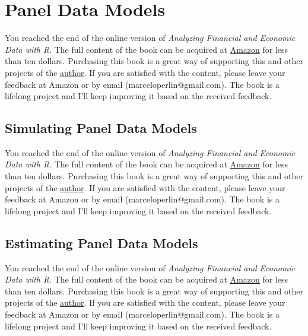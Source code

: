 \documentclass[
  12pt,
]{book}
\newenvironment{pleasebuyit}
{\begin{noteblock}
		
	} {\end{noteblock}}
\begin{document}
\hypertarget{panel-data-models}{%
\section{Panel Data Models}\label{panel-data-models}}

\begin{pleasebuyit}
You reached the end of the online version of \emph{Analyzing Financial
and Economic Data with R}. The full content of the book can be acquired
at \href{https://www.amazon.com/dp/B084LSNXMN}{Amazon} for less than ten
dollars. Purchasing this book is a great way of supporting this and
other projects of the \href{https://www.msperlin.com/}{author}. If you
are satisfied with the content, please leave your feedback at Amazon or
by email (marceloperlin@gmail.com). The book is a lifelong project and
I'll keep improving it based on the received feedback.
\end{pleasebuyit}

\hypertarget{simulating-panel-data-models}{%
\subsection{Simulating Panel Data Models}\label{simulating-panel-data-models}}

\begin{pleasebuyit}
You reached the end of the online version of \emph{Analyzing Financial
and Economic Data with R}. The full content of the book can be acquired
at \href{https://www.amazon.com/dp/B084LSNXMN}{Amazon} for less than ten
dollars. Purchasing this book is a great way of supporting this and
other projects of the \href{https://www.msperlin.com/}{author}. If you
are satisfied with the content, please leave your feedback at Amazon or
by email (marceloperlin@gmail.com). The book is a lifelong project and
I'll keep improving it based on the received feedback.
\end{pleasebuyit}

\hypertarget{estimating-panel-data-models}{%
\subsection{Estimating Panel Data Models}\label{estimating-panel-data-models}}

\begin{pleasebuyit}
You reached the end of the online version of \emph{Analyzing Financial
and Economic Data with R}. The full content of the book can be acquired
at \href{https://www.amazon.com/dp/B084LSNXMN}{Amazon} for less than ten
dollars. Purchasing this book is a great way of supporting this and
other projects of the \href{https://www.msperlin.com/}{author}. If you
are satisfied with the content, please leave your feedback at Amazon or
by email (marceloperlin@gmail.com). The book is a lifelong project and
I'll keep improving it based on the received feedback.
\end{pleasebuyit}
\end{document}
